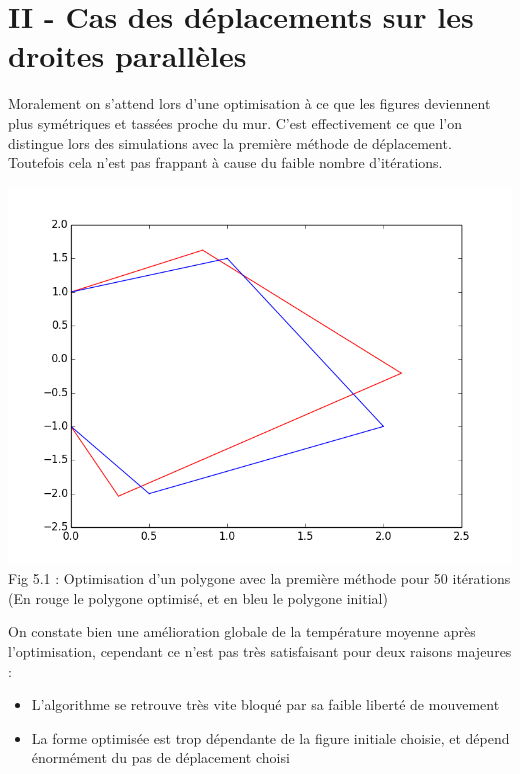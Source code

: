 \documentclass[a4paper,reqno]{article}
\newcommand{\pa}{\hspace{1cm}}
\begin{document}
\section*{II - Cas des déplacements sur les droites parallèles}

\pa Moralement on s'attend lors d'une optimisation à ce que les figures deviennent plus symétriques et tassées proche du mur. C'est effectivement ce que l'on distingue lors des simulations avec la première méthode de déplacement. Toutefois cela n'est pas frappant à cause du faible nombre d'itérations.
\begin{center}
	\includegraphics[scale=0.7]{test50.png}\\
	\vspace{0.2cm}
	Fig 5.1 : Optimisation d'un polygone avec la première méthode pour 50 itérations (En rouge le polygone optimisé, et en bleu le polygone initial)\\
\end{center}

\par On constate bien une amélioration globale de la température moyenne après l'optimisation, cependant ce n'est pas très satisfaisant pour deux raisons majeures : \\
\begin{itemize}
	\item L'algorithme se retrouve très vite bloqué par sa faible liberté de mouvement
	\item La forme optimisée est trop dépendante de la figure initiale choisie, et dépend énormément du pas de déplacement choisi
\end{itemize}
\end{document}
